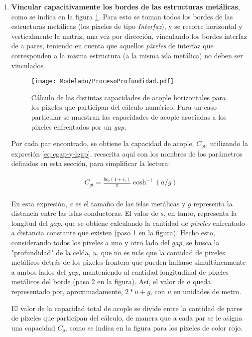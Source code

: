 \begin{enumerate}
	\item \textbf{Vincular capacitivamente los bordes de las estructuras metálicas}, como se indica en la figura \ref{fig:calculoCapacidadTLM}. Para esto se toman todos los bordes de las estructuras metálicas (los pixeles de tipo \textit{Interfaz}), y se recorre horizontal y verticalmente la matriz, una vez por dirección, vinculando los bordes interfaz de a pares, teniendo en cuenta que aquellos \textit{pixeles} de interfaz que corresponden a la misma estructura (a la misma isla metálica) no deben ser vinculados.
	
	\begin{figure}[h]
		\centering
		\texttt{[image: Modelado/ProcesoProfundidad.pdf]}
		\caption{Cálculo de las distintas capacidades de acople horizontales para los pixeles que participan del cálculo numérico. Para un caso particular se muestran las capacidades de acople asociadas a los pixeles enfrentados por un \textit{gap}.}
		\label{fig:calculoCapacidadTLM}
	\end{figure}
	
	Por cada par encontrado, se obtiene la capacidad de acople, $C_{gt}$, utilizando la expresión \ref{eq:cgap-y-lgap}, reescrita aquí con los nombres de los parámetros definidos en esta sección, para simplificar la lectura:
	
	\begin{align*}
		C_{gt} = \frac{b \epsilon_0 (1+\epsilon_r)}{\pi} \cosh^{-1} (a / g) \\
	\end{align*}
	
	En esta expresión, $a$ es el tamaño de las islas metálicas y $g$ representa la distancia entre las islas conductoras. El valor de $s$, en tanto, representa la longitud del $gap$, que se obtiene calculando la cantidad de \textit{pixeles} enfrentado a distancia constante que existen (paso 1 en la figura). Hecho esto, considerando todos los pixeles a uno y otro lado del \textit{gap}, se busca la "profundidad" de la celda, $u$, que no es más que la cantidad de pixeles metálicos detrás de los pixeles frontera que pueden hallarse simultáneamente a ambos lados del \textit{gap}, manteniendo al cantidad longitudinal de pixeles metálicos del borde (paso 2 en la figura). Así, el valor de $a$ queda representado por, aproximadamente, $2*u+g$, con $u$ en unidades de metro.
	
	El valor de la capacidad total de acople se divide entre la cantidad de pares de pixeles que participan del cálculo, de manera que a cada par se le asigna una capacidad $C_g$, como se indica en la figura para los pixeles de color rojo.
	

\end{enumerate}
